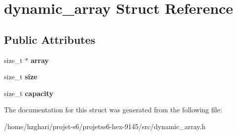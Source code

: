 \hypertarget{structdynamic__array}{}\section{dynamic\+\_\+array Struct Reference}
\label{structdynamic__array}
\subsection*{Public Attributes}
\begin{DoxyCompactItemize}
\item 
\mbox{\label{structdynamic__array_a3e353cca5079ed24ce59d2c8da1a2a80}} 
size\+\_\+t $\ast$ {\bfseries array}
\item 
\mbox{\label{structdynamic__array_a7ea6d4876d9c1dbc9b8090eaa265fa4e}} 
size\+\_\+t {\bfseries size}
\item 
\mbox{\label{structdynamic__array_a400420e54fe59f13473173f3497b2c6d}} 
size\+\_\+t {\bfseries capacity}
\end{DoxyCompactItemize}


The documentation for this struct was generated from the following file\+:\begin{DoxyCompactItemize}
\item 
/home/hzghari/projet-\/s6/projetss6-\/hex-\/9145/src/dynamic\+\_\+array.\+h\end{DoxyCompactItemize}
